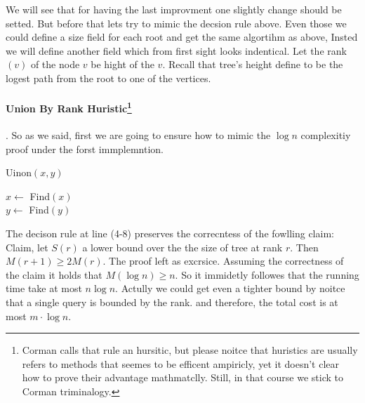 We will see that for having the last improvment one slightly change should be setted. But before that lets try to mimic the decsion rule above. Even those we could define a size field for each root and get the same algortihm as above, Insted we will define another field which from first sight looks indentical. Let the rank$\left( v \right)$ of the node $v$ be hight of the $v$. Recall that tree's height define to be the logest path from the root to one of the vertices. 

\paragraph{Union By Rank Huristic\protect\footnote{Corman calls that rule an hursitic, but please noitce that huristics are usually refers to methods that seemes to be efficent ampiricly, yet it doesn't clear how to prove their advantage mathmatclly. Still, in that course we stick to Corman triminalogy.}}. So as we said, first we are going to ensure how to mimic the $\log n$ complexitiy proof under the forst immplemntion. 

\begin{algbox}{Uinon$(x,y)$}
  \begin{algorithm}[H]
    $x\leftarrow $ Find$\left( x \right)$ \\
    $y\leftarrow $ Find$\left( y \right)$ \\
  \end{algorithm}
\end{algbox}
The decison rule at line (4-8) preserves the correcntess of the fowlling claim:
Claim, let $S(r)$ a lower bound over the the size of tree at rank $r$. Then $M\left( r+1 \right) \ge 2M\left( r \right)$. The proof left as excrsice. Assuming the correctness of the claim it holds that $M\left( \log n \right) \ge n $. So it immidetly followes that the running time take at most $n\log n$. Actully we could get even a tighter bound by noitce that a single query is bounded by the rank. and therefore, the total cost is at most $m \cdot \log n$. 

